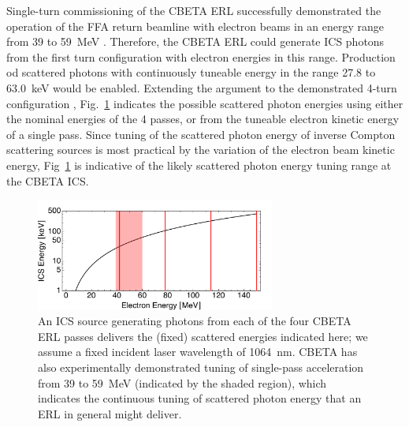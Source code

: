 \documentclass[../main.tex]{subfiles}
\begin{document}
Single-turn commissioning of the CBETA ERL successfully demonstrated the operation of the FFA return beamline with electron beams in an energy range from 39 to 59~\si{\mega\electronvolt} \cite{gulliford2019beam,gulliford2021measurement}. Therefore, the CBETA ERL could generate ICS photons from the first turn configuration with electron energies in this range. Production od scattered photons with continuously tuneable energy in the range 27.8 to 63.0~\si{\kilo\electronvolt} would be enabled. Extending the argument to the demonstrated 4-turn configuration \cite{bartnik2020cbeta}, Fig.~\ref{fig:CBETA_ICS_energy_tuning} indicates the possible scattered photon energies using either the nominal energies of the 4 passes, or from the tuneable electron kinetic energy of a single pass. Since tuning of the scattered photon energy of inverse Compton scattering sources is most practical by the variation of the electron beam kinetic energy, Fig~\ref{fig:CBETA_ICS_energy_tuning} is indicative of the likely scattered photon energy tuning range at the CBETA ICS.  
\begin{figure}[!h]
\centering
\includegraphics[width=0.7\textwidth]{Figures/CBETA_Inverse_Compton_Source_Design/CBETA_ICS_energy_tuning.pdf}
\caption{An ICS source generating photons from each of the four CBETA ERL passes delivers the (fixed) scattered energies indicated here; we assume a fixed incident laser wavelength of 1064~\si{\nano\meter}. CBETA has also experimentally demonstrated tuning of single-pass acceleration from 39 to 59~\si{\mega\electronvolt} (indicated by the shaded region), which indicates the continuous tuning of scattered photon energy that an ERL in general might deliver.}
\label{fig:CBETA_ICS_energy_tuning}
\end{figure}
\end{document}
